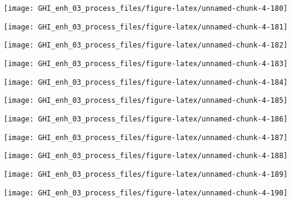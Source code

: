 \documentclass[
  10pt,
  a4paper,oneside]{article}
\begin{document}
\begin{center}\texttt{[image: GHI\_enh\_03\_process\_files/figure-latex/unnamed-chunk-4-180]} \end{center}

\begin{center}\texttt{[image: GHI\_enh\_03\_process\_files/figure-latex/unnamed-chunk-4-181]} \end{center}

\begin{center}\texttt{[image: GHI\_enh\_03\_process\_files/figure-latex/unnamed-chunk-4-182]} \end{center}

\begin{center}\texttt{[image: GHI\_enh\_03\_process\_files/figure-latex/unnamed-chunk-4-183]} \end{center}

\begin{center}\texttt{[image: GHI\_enh\_03\_process\_files/figure-latex/unnamed-chunk-4-184]} \end{center}

\begin{center}\texttt{[image: GHI\_enh\_03\_process\_files/figure-latex/unnamed-chunk-4-185]} \end{center}

\begin{center}\texttt{[image: GHI\_enh\_03\_process\_files/figure-latex/unnamed-chunk-4-186]} \end{center}

\begin{center}\texttt{[image: GHI\_enh\_03\_process\_files/figure-latex/unnamed-chunk-4-187]} \end{center}

\begin{center}\texttt{[image: GHI\_enh\_03\_process\_files/figure-latex/unnamed-chunk-4-188]} \end{center}

\begin{center}\texttt{[image: GHI\_enh\_03\_process\_files/figure-latex/unnamed-chunk-4-189]} \end{center}

\begin{center}\texttt{[image: GHI\_enh\_03\_process\_files/figure-latex/unnamed-chunk-4-190]} \end{center}
\end{document}
